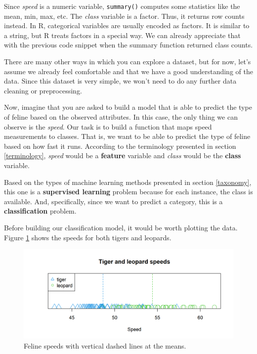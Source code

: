 \documentclass[
  11pt,
]{krantz}
\begin{document}
Since \emph{speed} is a numeric variable, \texttt{summary()} computes some statistics like the mean, min, max, etc. The \emph{class} variable is a factor. Thus, it returns row counts instead. In R, categorical variables are usually encoded as factors. It is similar to a string, but R treats factors in a special way. We can already appreciate that with the previous code snippet when the summary function returned class counts.

There are many other ways in which you can explore a dataset, but for now, let's assume we already feel comfortable and that we have a good understanding of the data. Since this dataset is very simple, we won't need to do any further data cleaning or preprocessing.

Now, imagine that you are asked to build a model that is able to predict the type of feline based on the observed attributes. In this case, the only thing we can observe is the \emph{speed}. Our task is to build a function that maps speed measurements to classes. That is, we want to be able to predict the type of feline based on how fast it runs. According to the terminology presented in section \ref{terminology}, \emph{speed} would be a \textbf{feature} variable and \emph{class} would be the \textbf{class} variable.

Based on the types of machine learning methods presented in section \ref{taxonomy}, this one is a \textbf{supervised learning} problem because for each instance, the class is available. And, specifically, since we want to predict a category, this is a \textbf{classification} problem.

Before building our classification model, it would be worth plotting the data. Figure \ref{fig:felineSpeeds} shows the speeds for both tigers and leopards.

\begin{figure}

{\centering \includegraphics[width=1\linewidth]{images/felineSpeeds} 

}

\caption{Feline speeds with vertical dashed lines at the means.}\label{fig:felineSpeeds}
\end{figure}
\end{document}
